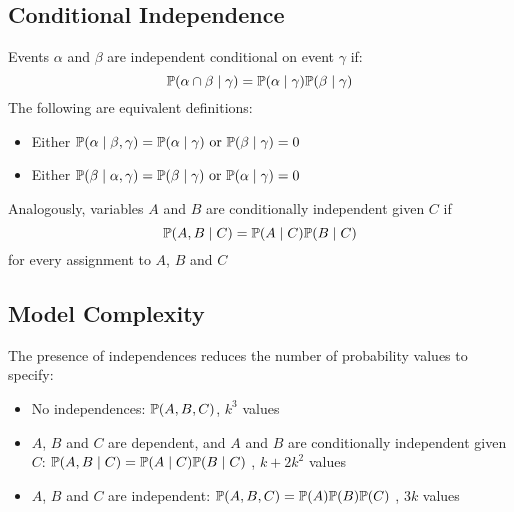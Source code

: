 \subsection{Conditional Independence}
	\begin{frame}
		Events $\alpha$ and $\beta$ are independent conditional on event $\gamma$ if:
			\[ \P( \alpha \cap \beta \mid \gamma ) = \P( \alpha \mid \gamma ) \P( \beta \mid \gamma ) \]
		The following are equivalent definitions:
		\begin{itemize}
			\item Either $\P( \alpha \mid \beta , \gamma ) = \P( \alpha \mid \gamma ) \text{ or } \P( \beta \mid \gamma ) = 0$
			\item Either $\P( \beta \mid \alpha , \gamma ) = \P( \beta \mid \gamma ) \text{ or } \P( \alpha \mid \gamma ) = 0$
		\end{itemize}
		Analogously, variables $A$ and $B$ are conditionally independent given $C$ if
			\[ \P( A , B \mid C ) = \P( A \mid C ) \P( B \mid C ) \]
		for every assignment to $A$, $B$ and $C$
	\end{frame}
	
\subsection{Model Complexity}
	\begin{frame}
		The presence of independences reduces the number of probability values to specify:
		\begin{itemize}
			\item \alert{No independences}: $\P( A , B , C )$, $k^3$ values
			\item $A$, $B$ and $C$ are \alert{dependent}, and $A$ and $B$ are \alert{conditionally independent} given $C$: $\P( A , B \mid C ) = \P( A \mid C ) \P( B \mid C )$ , $k + 2k^2$ values
			\item $A$, $B$ and $C$ are \alert{independent}: $\P( A , B , C ) = \P( A ) \P( B ) \P( C )$ , $3k$ values
		\end{itemize}
	\end{frame}